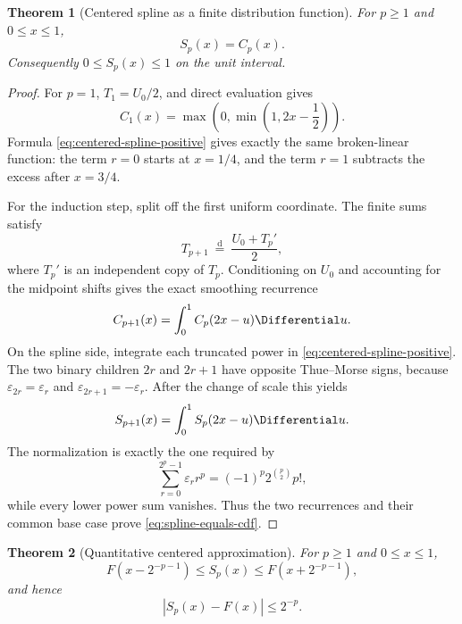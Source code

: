 \documentclass[11pt,oneside]{article}
\newtheorem{theorem}{Theorem}[section]
\theoremstyle{definition}
\theoremstyle{remark}
\begin{document}
\begin{theorem}[Centered spline as a finite distribution function]
\label{thm:centered-spline-cdf}
For $p\ge1$ and $0\le x\le1$,
\begin{equation}
 S_p(x)=C_p(x).                                            \label{eq:spline-equals-cdf}
\end{equation}
Consequently $0\le S_p(x)\le1$ on the unit interval.
\end{theorem}

\begin{proof}
For $p=1$, $T_1=U_0/2$, and direct evaluation gives
\[
 C_1(x)=\max\left(0,\min\left(1,2x-\frac12\right)\right).
\]
Formula \eqref{eq:centered-spline-positive} gives exactly the same broken-linear
function: the term $r=0$ starts at $x=1/4$, and the term $r=1$ subtracts the excess
after $x=3/4$.

For the induction step, split off the first uniform coordinate.  The finite sums satisfy
\[
 T_{p+1}\ \overset{\mathrm d}=\ \frac{U_0+T_p'}2,
\]
where $T_p'$ is an independent copy of $T_p$.  Conditioning on $U_0$ and accounting for
the midpoint shifts gives the exact smoothing recurrence
\begin{equation}
 C_{p+1}(x)=\int_0^1 C_p(2x-u)\Differential u.                      \label{eq:centered-cdf-smoothing}
\end{equation}
On the spline side, integrate each truncated power in
\eqref{eq:centered-spline-positive}.  The two binary children $2r$ and $2r+1$
have opposite Thue--Morse signs, because
\(\varepsilon_{2r}=\varepsilon_r\) and
\(\varepsilon_{2r+1}=-\varepsilon_r\).  After the change of scale this yields
\begin{equation}
 S_{p+1}(x)=\int_0^1 S_p(2x-u)\Differential u.                      \label{eq:centered-spline-smoothing}
\end{equation}
The normalization is exactly the one required by
\[
 \sum_{r=0}^{2^p-1}\varepsilon_r r^p
 =(-1)^p2^{\binom p2}p!,
\]
while every lower power sum vanishes.  Thus the two recurrences and their common base
case prove \eqref{eq:spline-equals-cdf}.
\end{proof}

\begin{theorem}[Quantitative centered approximation]
\label{thm:centered-spline-error}
For $p\ge1$ and $0\le x\le1$,
\begin{equation}
 F(x-2^{-p-1})\le S_p(x)\le F(x+2^{-p-1}),                \label{eq:centered-sandwich}
\end{equation}
and hence
\begin{equation}
 |S_p(x)-F(x)|\le2^{-p}.                                  \label{eq:centered-error}
\end{equation}
\end{theorem}
\end{document}

